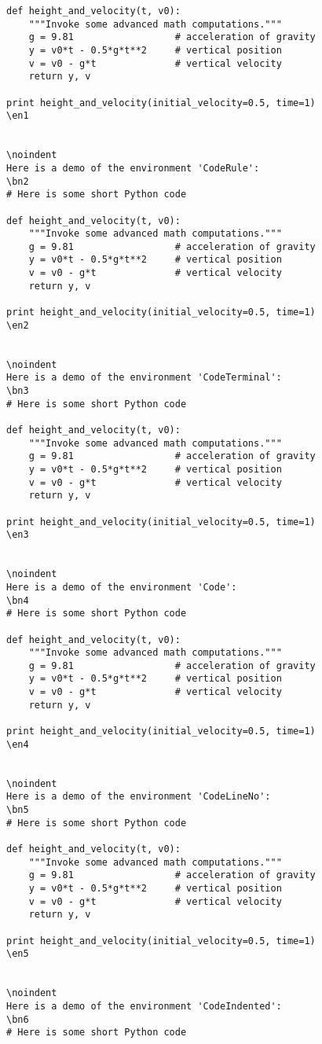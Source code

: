 \documentclass[a4paper,11pt]{article}
\begin{document}
{{{{{{{{{{{\begin{Verbatim}
def height_and_velocity(t, v0):
    """Invoke some advanced math computations."""
    g = 9.81                  # acceleration of gravity
    y = v0*t - 0.5*g*t**2     # vertical position
    v = v0 - g*t              # vertical velocity
    return y, v

print height_and_velocity(initial_velocity=0.5, time=1)
\en1


\noindent
Here is a demo of the environment 'CodeRule':
\bn2
# Here is some short Python code

def height_and_velocity(t, v0):
    """Invoke some advanced math computations."""
    g = 9.81                  # acceleration of gravity
    y = v0*t - 0.5*g*t**2     # vertical position
    v = v0 - g*t              # vertical velocity
    return y, v

print height_and_velocity(initial_velocity=0.5, time=1)
\en2


\noindent
Here is a demo of the environment 'CodeTerminal':
\bn3
# Here is some short Python code

def height_and_velocity(t, v0):
    """Invoke some advanced math computations."""
    g = 9.81                  # acceleration of gravity
    y = v0*t - 0.5*g*t**2     # vertical position
    v = v0 - g*t              # vertical velocity
    return y, v

print height_and_velocity(initial_velocity=0.5, time=1)
\en3


\noindent
Here is a demo of the environment 'Code':
\bn4
# Here is some short Python code

def height_and_velocity(t, v0):
    """Invoke some advanced math computations."""
    g = 9.81                  # acceleration of gravity
    y = v0*t - 0.5*g*t**2     # vertical position
    v = v0 - g*t              # vertical velocity
    return y, v

print height_and_velocity(initial_velocity=0.5, time=1)
\en4


\noindent
Here is a demo of the environment 'CodeLineNo':
\bn5
# Here is some short Python code

def height_and_velocity(t, v0):
    """Invoke some advanced math computations."""
    g = 9.81                  # acceleration of gravity
    y = v0*t - 0.5*g*t**2     # vertical position
    v = v0 - g*t              # vertical velocity
    return y, v

print height_and_velocity(initial_velocity=0.5, time=1)
\en5


\noindent
Here is a demo of the environment 'CodeIndented':
\bn6
# Here is some short Python code


\end{Verbatim}}}}}}}}}}}}
\end{document}
